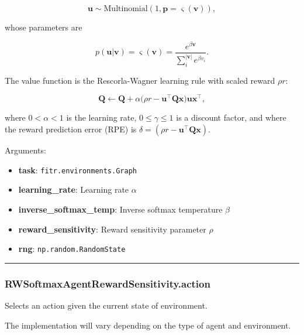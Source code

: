 \[
\mathbf u \sim \mathrm{Multinomial}(1, \mathbf p=\varsigma(\mathbf v)),
\]

whose parameters are

\[
p(\mathbf u|\mathbf v) = \varsigma(\mathbf v) = \frac{e^{\beta \mathbf v}}{\sum_{i}^{|\mathbf v|} e^{\beta v_i}}.
\]

The value function is the Rescorla-Wagner learning rule with scaled
reward \(\rho r\):

\[
\mathbf Q \gets \mathbf Q + \alpha \big(\rho r - \mathbf u^\top \mathbf Q \mathbf x \big) \mathbf u \mathbf x^\top,
\]

where \(0 < \alpha < 1\) is the learning rate, \(0 \leq \gamma \leq 1\)
is a discount factor, and where the reward prediction error (RPE) is
\(\delta = (\rho r - \mathbf u^\top \mathbf Q \mathbf x)\).

Arguments:

\begin{itemize}
\tightlist
\item
  \textbf{task}: \texttt{fitr.environments.Graph}
\item
  \textbf{learning\_rate}: Learning rate \(\alpha\)
\item
  \textbf{inverse\_softmax\_temp}: Inverse softmax temperature \(\beta\)
\item
  \textbf{reward\_sensitivity}: Reward sensitivity parameter \(\rho\)
\item
  \textbf{rng}: \texttt{np.random.RandomState}
\end{itemize}

\begin{center}\rule{0.5\linewidth}{\linethickness}\end{center}

\subsubsection{RWSoftmaxAgentRewardSensitivity.action}\label{rwsoftmaxagentrewardsensitivity.action}

\begin{Shaded}
\begin{Highlighting}[]
\end{Highlighting}
\end{Shaded}

Selects an action given the current state of environment.

The implementation will vary depending on the type of agent and
environment.

